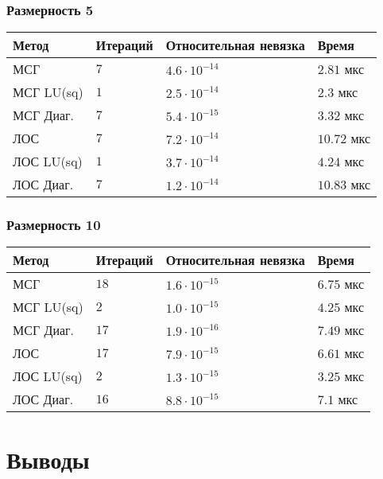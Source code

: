\subsubsection{Размерность 5}

\setlength{\tabcolsep}{2pt}
\tabulinesep=0.3mm
\noindent\begin{tabu}{|X[-1,l]|X[-1,l]|X[-1,l]|X[-1,l]|}
\hline
Метод & Итераций & Относительная невязка & Время \\ \hline
МСГ & $7$ & $4.6 \cdot 10^{-14}$ & $2.81$ мкс \\ \hline
{}
МСГ LU(sq) & $1$ & $2.5 \cdot 10^{-14}$ & $2.3$ мкс \\ \hline
МСГ Диаг. & $7$ & $5.4 \cdot 10^{-15}$ & $3.32$ мкс \\ \hline
ЛОС & $7$ & $7.2 \cdot 10^{-14}$ & $10.72$ мкс \\ \hline
ЛОС LU(sq) & $1$ & $3.7 \cdot 10^{-14}$ & $4.24$ мкс \\ \hline
ЛОС Диаг. & $7$ & $1.2 \cdot 10^{-14}$ & $10.83$ мкс \\ \hline
\end{tabu}

\subsubsection{Размерность 10}

\setlength{\tabcolsep}{2pt}
\tabulinesep=0.3mm
\noindent\begin{tabu}{|X[-1,l]|X[-1,l]|X[-1,l]|X[-1,l]|}
\hline
Метод & Итераций & Относительная невязка & Время \\ \hline
МСГ & $18$ & $1.6 \cdot 10^{-15}$ & $6.75$ мкс \\ \hline
МСГ LU(sq) & $2$ & $1.0 \cdot 10^{-15}$ & $4.25$ мкс \\ \hline
МСГ Диаг. & $17$ & $1.9 \cdot 10^{-16}$ & $7.49$ мкс \\ \hline
ЛОС & $17$ & $7.9 \cdot 10^{-15}$ & $6.61$ мкс \\ \hline
{}
ЛОС LU(sq) & $2$ & $1.3 \cdot 10^{-15}$ & $3.25$ мкс \\ \hline
ЛОС Диаг. & $16$ & $8.8 \cdot 10^{-15}$ & $7.1$ мкс \\ \hline
\end{tabu}

\section{Выводы}

